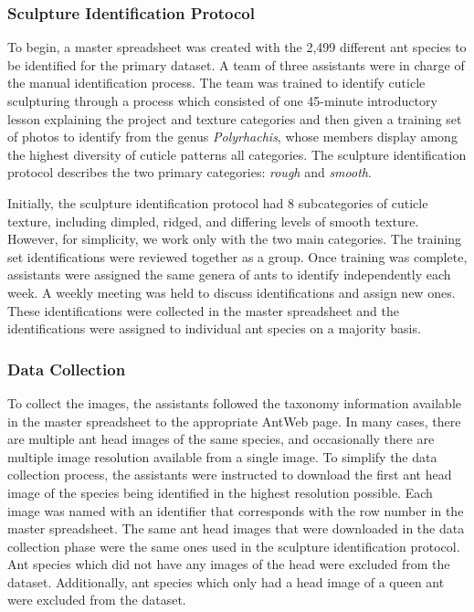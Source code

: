 \documentclass[12pt]{article}
\begin{document}
\subsubsection{Sculpture Identification Protocol}
To begin, a master spreadsheet was created with the 2,499 different ant species
to be identified for the primary dataset. A team of three assistants were in
charge of the manual identification process. The team was trained to identify
cuticle sculpturing through a process which consisted of one 45-minute
introductory lesson explaining the project and texture categories and then given
a training set of photos to identify from the genus \textit{Polyrhachis}, whose
members display among the highest diversity of cuticle patterns all categories.
The sculpture identification protocol describes the two primary categories:
\textit{rough} and \textit{smooth}.

Initially, the sculpture identification protocol had 8 subcategories of cuticle
texture, including dimpled, ridged, and differing levels of smooth texture.
However, for simplicity, we work only with the two main categories. The training
set identifications were reviewed together as a group. Once training was
complete, assistants were assigned the same genera of ants to identify
independently each week. A weekly meeting was held to discuss identifications
and assign new ones. These identifications were collected in the master
spreadsheet and the identifications were assigned to individual ant species on a
majority basis.

\subsubsection{Data Collection}
To collect the images, the assistants followed the taxonomy information
available in the master spreadsheet to the appropriate AntWeb page. In many
cases, there are multiple ant head images of the same species, and occasionally
there are multiple image resolution available from a single image. To simplify
the data collection process, the assistants were instructed to download the
first ant head image of the species being identified in the highest resolution
possible. Each image was named with an identifier that corresponds with the row
number in the master spreadsheet. The same ant head images that were downloaded
in the data collection phase were the same ones used in the sculpture
identification protocol. Ant species which did not have any images of the head
were excluded from the dataset. Additionally, ant species which only had a head
image of a queen ant were excluded from the dataset.
\end{document}

